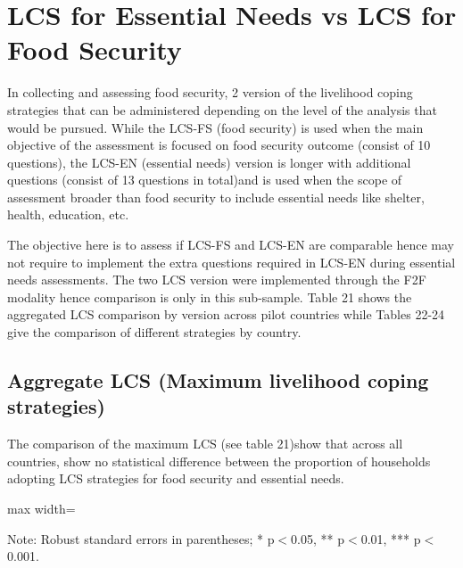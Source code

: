 \documentclass[11pt,harvard]{article}
\begin{document}
\pagebreak

\section{LCS for Essential Needs vs LCS for Food Security}

In collecting and assessing food security, 2 version of the livelihood coping strategies that can be administered depending on the level of the analysis that would be pursued. While the LCS-FS (food security) is used when the main objective of the assessment is focused on food security outcome (consist of 10 questions), the LCS-EN (essential needs) version is longer with additional questions (consist of 13 questions in total)and is used when the scope of assessment broader than food security to include essential needs like shelter, health, education, etc.
 
The objective here is to assess if LCS-FS and LCS-EN are comparable hence may not require to implement the extra questions required in LCS-EN during essential needs assessments. The two LCS version were implemented through the F2F modality hence comparison is only in this sub-sample. Table 21 shows the aggregated LCS comparison by version across pilot countries while Tables 22-24 give the comparison of different strategies by country.

 
\subsection{Aggregate LCS (Maximum livelihood coping strategies)}

The comparison of the maximum LCS (see table 21)show that across all countries, show no statistical difference between the proportion of households adopting LCS strategies for food security and essential needs. 

\begin{table}[htbp]
	\centering
	\begin{adjustbox}{max width=\textwidth}
		\begin{threeparttable}
			\caption{Myanmar: LCS for Essential Needs vs. Food Security}
			\scriptsize
			 
			\label{tab:LCS_F2F_EN_FS_All_Country}
			\begin{tablenotes}
				\item Note: Robust standard errors in parentheses; * p$<$0.05, ** p$<$0.01, *** p$<$0.001. 
			\end{tablenotes}
		\end{threeparttable}
	\end{adjustbox}
\end{table}
\end{document}
